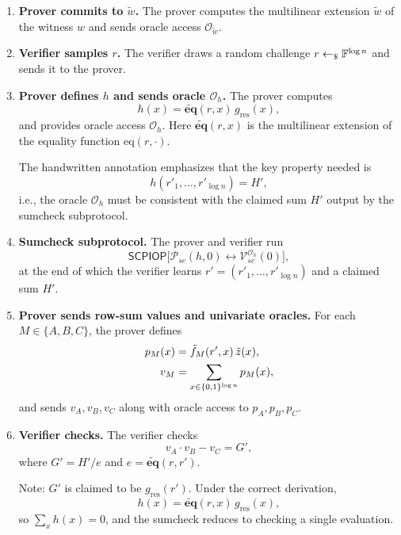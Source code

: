 \documentclass[11pt]{article}
\newcommand{\tildew}{\tilde{w}}
\newcommand{\tildeq}{\tilde{\mathbf{eq}}}
\newcommand{\tildez}{\tilde{z}}
\begin{document}
\begin{enumerate}
  \item \textbf{Prover commits to $\tildew$.}  The prover computes the multilinear extension
    $\tildew$ of the witness $w$ and sends oracle access $\mathcal{O}_{\tildew}$.

  \item \textbf{Verifier samples $r$.}  The verifier draws a random challenge
    $r \leftarrow_\$ \mathbb{F}^{\log n}$ and sends it to the prover.

  \item \textbf{Prover defines $h$ and sends oracle $\mathcal{O}_h$.}  The prover computes
    \[
      h(x) = \tildeq(r, x)\, g_{\mathrm{res}}(x),
    \]
    and provides oracle access $\mathcal{O}_h$.  Here $\tildeq(r,x)$ is the multilinear
    extension of the equality function $\mathrm{eq}(r,\cdot)$.

    \begin{remark}
      The handwritten annotation emphasizes that the key property needed is
      \[
        h(r'_1, \ldots, r'_{\log n}) = H',
      \]
      i.e., the oracle $\mathcal{O}_h$ must be consistent with the claimed sum $H'$
      output by the sumcheck subprotocol.
    \end{remark}

  \item \textbf{Sumcheck subprotocol.}  The prover and verifier run
    \[
      \mathsf{SCPIOP}\bigl[\mathcal{P}_{sc}(h,0) \leftrightarrow
      \mathcal{V}_{sc}^{\mathcal{O}_h}(0)\bigr],
    \]
    at the end of which the verifier learns
    $r' = (r'_1, \ldots, r'_{\log n})$ and a claimed sum $H'$.

  \item \textbf{Prover sends row-sum values and univariate oracles.}  For each
    $M \in \{A, B, C\}$, the prover defines
    \begin{align*}
      p_M(x) &= \tilde{f}_M(r', x)\,\tildez(x), \\
      v_M    &= \sum_{x \in \bits^{\log n}} p_M(x),
    \end{align*}
    and sends $v_A, v_B, v_C$ along with oracle access to $p_A, p_B, p_C$.

  \item \textbf{Verifier checks.}  The verifier checks
    \[
      v_A \cdot v_B - v_C = G',
    \]
    where $G' = H' / e$ and $e = \tildeq(r, r')$.

    Note: $G'$ is claimed to be $g_{\mathrm{res}}(r')$.  Under the correct derivation,
    \[
      h(x) = \tildeq(r, x)\, g_{\mathrm{res}}(x),
    \]
    so $\sum_x h(x) = 0$, and the sumcheck reduces to checking a single evaluation.
\end{enumerate}
\end{document}
